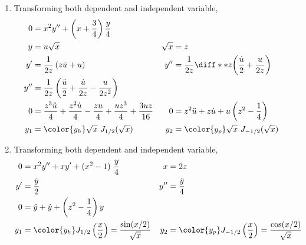 \begin{enumerate}
    \item Transforming both dependent and independent variable,
          \begin{align}
              0               & = x^2y'' + \left( x + \frac{3}{4} \right)
              \frac{y}{4}                                                            \\
              y               & = u\sqrt{x}                                        &
              \sqrt{x}        & = z                                                  \\
              y'              & = \frac{1}{2z} \left( z\dot{u} + u \right)         &
              y''             & = \frac{1}{2z} \diff**{z}{\left( \frac{\dot{u}}{2}
              + \frac{u}{2z} \right)}                                                \\
              y''             & = \frac{1}{2z} \left( \frac{\ddot{u}}{2}
              + \frac{\dot{u}} {2z} - \frac{u}{2z^2} \right)                         \\
              0               & = \frac{z^3\ddot{u}}{4} + \frac{z^2\dot{u}}{4}
              -\frac{zu}{4} + \frac{uz^3}{4}
              +\frac{3uz}{16} &
              0               & = z^2\ddot{u} + z\dot{u}
              + u \left( z^2 - \frac{1}{4} \right)                                   \\
              y_1             & = \color{y_h} \sqrt{x}\ J_{1/2}(\sqrt{x})          &
              y_2             & = \color{y_p} \sqrt{x}\ J_{-1/2}(\sqrt{x})
          \end{align}

    \item Transforming both dependent and independent variable,
          \begin{align}
              0          & = x^2y'' + xy' + (x^2 - 1)\ \frac{y}{4}          &
              x          & = 2z                                               \\
              y'         & = \frac{\dot{y}}{2}                              &
              y''        & = \frac{\ddot{y}}{4}                               \\
              0          & = \ddot{y} + \dot{y} + \left( z^2
              - \frac{1}{4} \right) y                                         \\
              y_1        & = \color{y_h} J_{1/2}\left( \frac{x}{2} \right)
              = \frac{\sin(x/2)}
              {\sqrt{x}} &
              y_2        & = \color{y_p} J_{-1/2}\left( \frac{x}{2} \right)
              = \frac{\cos(x/2)}{\sqrt{x}}
          \end{align}


\end{enumerate}
